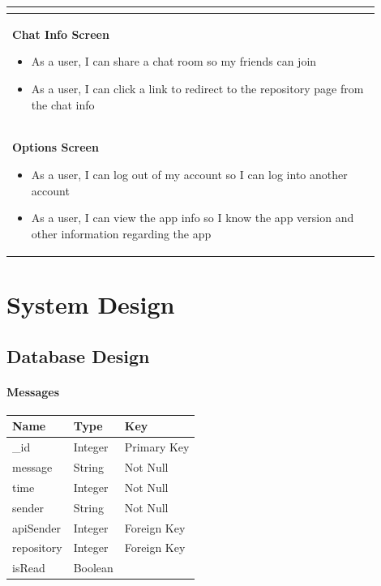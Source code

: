 \documentclass{report}
\begin{document}
\begin{center}
\begin{tabular}{ | p{0.9\linewidth} |}
\begin{itemize}
                            \end{itemize} \\
        \hline
        \textbf{Chat Info Screen}\begin{itemize}
                                     \item As a user, I can share a chat room so my friends can join
                                     \item As a user, I can click a link to redirect to the repository page from the chat info
                                 \end{itemize}                                      \\
        \hline
        \textbf{Options Screen}\begin{itemize}
                                   \item As a user, I can log out of my account so I can log into another account
                                   \item As a user, I can view the app info so I know the app version and other information regarding the app

                               \end{itemize}                       \\
        \hline
    \end{tabular}
\end{center}

\chapter{System Design}

\section{Database Design}

\subsubsection{Messages}
\begin{tabular}{| l | l | l |}
    \hline
    \textbf{Name} & \textbf{Type} & \textbf{Key} \\
    \hline
    \hline
    \_id          & Integer       & Primary Key  \\
    \hline
    message       & String        & Not Null     \\
    \hline
    time          & Integer       & Not Null     \\
    \hline
    sender        & String        & Not Null     \\
    \hline
    apiSender     & Integer       & Foreign Key  \\
    \hline
    repository    & Integer       & Foreign Key  \\
    \hline
    isRead        & Boolean       &              \\
    \hline
\end{tabular}
\end{document}

